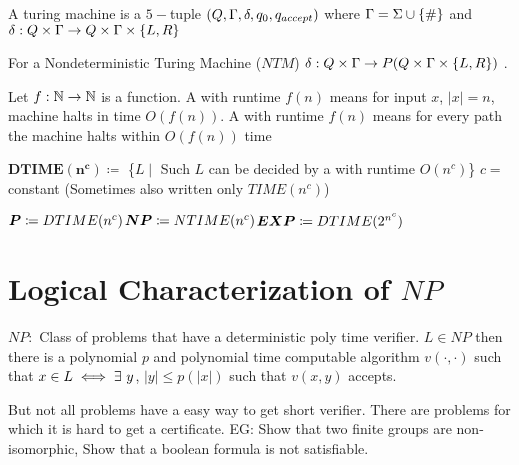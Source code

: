 \documentclass{article}
\begin{document}
	
	A turing machine  is a $5-$tuple $(Q,\Gamma, \delta, q_0, q_{accept})$ where $\Gamma=\Sigma\cup \{\#\}$ and $\delta:Q\times \Gamma\to Q\times \Gamma\times \{L,R\}$
	
	For a Nondeterministic Turing Machine ($NTM$)  $\delta :Q\times \Gamma\to P(Q\times \Gamma\times \{L,R\})$
	. 
	\begin{center}
	\end{center}
	
	Let $f:\mathbb{N}\to \mathbb{N}$ is a function. A \dtm with runtime $f(n)$ means for input $x$, $|x|=n$, machine halts in time $O(f(n))$. A \ntm  with runtime $f(n)$ means for every path the machine halts within $O(f(n))$ time
\parinf

$\boldsymbol{DTIME(n^c)}\coloneqq$ \{$L\mid$ Such $L$ can be decided by a \dtm with runtime $O(n^c)$\} $c=$constant (Sometimes also written only $TIME(n^c)$)

$\boldsymbol{P}\coloneqq DTIME(n^c)$\hfill $\boldsymbol{N}\boldsymbol{P}\coloneqq NTIME(n^c)$\hfill $\boldsymbol{E}\boldsymbol{X}\boldsymbol{P}\coloneqq DTIME(2^{n^c})$

\section{Logical Characterization of $NP$}
$NP:$ Class of problems that have a deterministic poly time verifier. $L\in NP$ then there is a polynomial $p$ and polynomial time computable algorithm $v(\cdot,\cdot)$ such that $x\in L\iff \exists \ y$, $|y|\leq p(|x|)$ such that $v(x,y)$ accepts.\parinn

But not all problems have a easy way to get short verifier. There are problems for which it is hard to get a certificate. EG: Show that two finite groups are non-isomorphic, Show that a boolean formula is not satisfiable.
\end{document}
